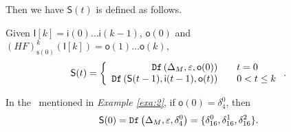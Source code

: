 Then we have $\mathsf{S}(t)$ is defined as follows. 
 \begin{definition}[$\mathsf{S}(t)$] Given $\mathsf{I}[k]=\mathsf{i}(0)\ldots\mathsf{i}(k-1)$, $\mathsf{o}(0)$ and $(HF)^k_{\mathsf{s}(0)}(\mathsf{I}[k])=\mathsf{o}(1)\ldots\mathsf{o}(k)$, %
	\[\mathsf{S}(t)=\left\{
\begin{array}{rcl}
{\tt Df}\left(\Delta_M,\varepsilon,\mathsf{o}(0)\right)      &      & {t=0}\\
{\tt Df}\left(\mathsf{S}(t-1),\mathsf{i}(t-1),\mathsf{o}(t)\right)       &      & 0<t\leq k
\end{array} \right. .\]

\end{definition}
\begin{example}
In the \BCN\ mentioned in {\em Example \ref{exa:2}}, if $\mathsf{o}(0)=\delta_4^0$, then \[\mathsf{S}(0)={\tt Df}\left(\Delta_M,\varepsilon,\delta_4^0\right)=\{\delta_{16}^0,\delta_{16}^1,\delta_{16}^2\}.\]
 \label{exa:8}
 \end{example}   
 

 
 

